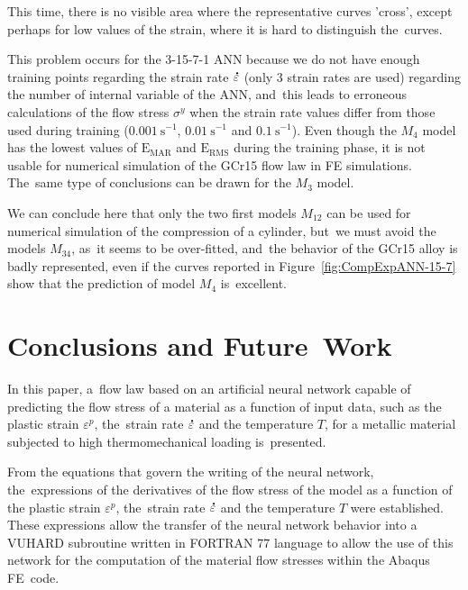\documentclass[algorithms,article,accept,pdftex,oneauthors]{Definitions/mdpi}
\DeclareRobustCommand{\mdot}[1]{\accentset{\mbox{\bfseries .}}{#1}}
\DeclareRobustCommand{\RMSE}{\text{E}_\text{RMS}}
\DeclareRobustCommand{\MARE}{\text{E}_\text{MAR}}
\DeclareRobustCommand{\ps}{\text{s}^{-1}}
\begin{document}
This time, there is no visible area where the representative curves 'cross', except perhaps for low values of the strain, where it is hard to distinguish the~curves.

This problem occurs for the 3-15-7-1 ANN because we do not have enough training points regarding the strain rate $\mdot\varepsilon$ (only 3 strain rates are used) regarding the number of internal variable of the ANN, and~this leads to erroneous calculations of the flow stress $\sigma^y$ when the strain rate values differ from those used during training ($0.001~\ps$, $0.01~\ps$ and $0.1~\ps$).
Even though the $M_4$ model has the lowest values of $\MARE$ and $\RMSE$ during the training phase, it is not usable for numerical simulation of the GCr15 flow law in FE simulations. The~same type of conclusions can be drawn for the $M_3$ model.

We can conclude here that only the two first models $M_{12}$ can be used for numerical simulation of the compression of a cylinder, but~we must avoid the models $M_{34}$, as~it seems to be over-fitted, and~the behavior of the GCr15 alloy is badly represented, even if the curves reported in Figure~\ref{fig:CompExpANN-15-7} show that the prediction of model $M_4$ is~excellent.

\section{Conclusions and Future~Work}\label{sec:Conclusions}

In this paper, a~flow law based on an artificial neural network capable of predicting the flow stress of a material as a function of input data, such as the plastic strain $\varepsilon^p$, the~strain rate $\mdot\varepsilon$ and the temperature $T$, for a metallic material subjected to high thermomechanical loading is~presented.

From the equations that govern the writing of the neural network, the~expressions of the derivatives of the flow stress of the model as a function of the plastic strain $\varepsilon^p$, the~strain rate $\mdot\varepsilon$ and the temperature $T$ were established.
These expressions allow the transfer of the neural network behavior into a VUHARD subroutine written in FORTRAN 77 language to allow the use of this network for the computation of the material flow stresses within the Abaqus FE~code.
\end{document}
